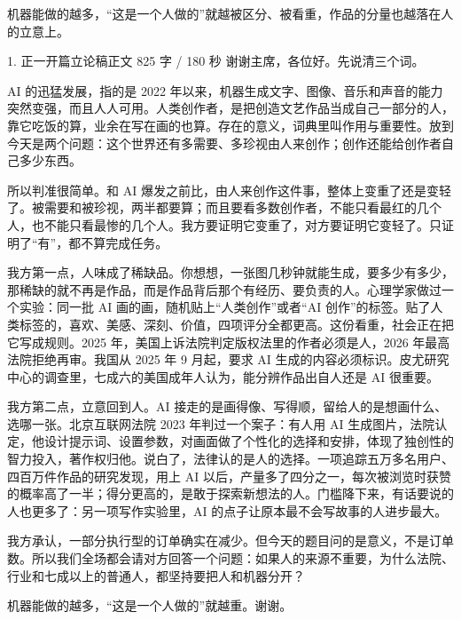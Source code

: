 \documentclass[script,pro]{debate}
\begin{document}
\debatetitle
\begin{thesisbox}[全场一句话立论]机器能做的越多，“这是一个人做的”就越被区分、被看重，作品的分量也越落在人的立意上。\end{thesisbox}

\begin{speech}{1. 正一开篇立论稿}{正文 825 字 / 180 秒}
谢谢主席，各位好。先说清三个词。

AI 的迅猛发展，指的是 2022 年以来，机器生成文字、图像、音乐和声音的能力突然变强，而且人人可用。人类创作者，是把创造文艺作品当成自己一部分的人，靠它吃饭的算，业余在写在画的也算。存在的意义，词典里叫作用与重要性。放到今天是两个问题：这个世界还有多需要、多珍视由人来创作；创作还能给创作者自己多少东西。

所以判准很简单。和 AI 爆发之前比，由人来创作这件事，整体上变重了还是变轻了。被需要和被珍视，两半都要算；而且要看多数创作者，不能只看最红的几个人，也不能只看最惨的几个人。我方要证明它变重了，对方要证明它变轻了。只证明了“有”，都不算完成任务。

我方第一点，人味成了稀缺品。你想想，一张图几秒钟就能生成，要多少有多少，那稀缺的就不再是作品，而是作品背后那个有经历、要负责的人。心理学家做过一个实验：同一批 AI 画的画，随机贴上“人类创作”或者“AI 创作”的标签。贴了人类标签的，喜欢、美感、深刻、价值，四项评分全都更高。这份看重，社会正在把它写成规则。2025 年，美国上诉法院判定版权法里的作者必须是人，2026 年最高法院拒绝再审。我国从 2025 年 9 月起，要求 AI 生成的内容必须标识。皮尤研究中心的调查里，七成六的美国成年人认为，能分辨作品出自人还是 AI 很重要。

我方第二点，立意回到人。AI 接走的是画得像、写得顺，留给人的是想画什么、选哪一张。北京互联网法院 2023 年判过一个案子：有人用 AI 生成图片，法院认定，他设计提示词、设置参数，对画面做了个性化的选择和安排，体现了独创性的智力投入，著作权归他。说白了，法律认的是人的选择。一项追踪五万多名用户、四百万件作品的研究发现，用上 AI 以后，产量多了四分之一，每次被浏览时获赞的概率高了一半；得分更高的，是敢于探索新想法的人。门槛降下来，有话要说的人也更多了：另一项写作实验里，AI 的点子让原本最不会写故事的人进步最大。

我方承认，一部分执行型的订单确实在减少。但今天的题目问的是意义，不是订单数。所以我们全场都会请对方回答一个问题：如果人的来源不重要，为什么法院、行业和七成以上的普通人，都坚持要把人和机器分开？

机器能做的越多，“这是一个人做的”就越重。谢谢。
\end{speech}
\begin{contingency}
\end{contingency}
\end{document}
